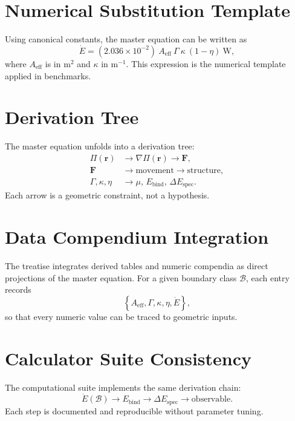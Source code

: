 \documentclass[12pt]{book}
\begin{document}
\section{Numerical Substitution Template}
Using canonical constants, the master equation can be written as
\begin{equation}
\dot{E} = (2.036 \times 10^{-2})\ A_{\text{eff}}\ \Gamma\ \kappa\ (1-\eta)\ \text{W},
\end{equation}
where $A_{\text{eff}}$ is in $\text{m}^2$ and $\kappa$ in $\text{m}^{-1}$. This expression is the
numerical template applied in benchmarks.

\section{Derivation Tree}
The master equation unfolds into a derivation tree:
\begin{align}
\Pi(\mathbf{r}) &\rightarrow \nabla \Pi(\mathbf{r}) \rightarrow \mathbf{F},\\
\mathbf{F} &\rightarrow \text{movement} \rightarrow \text{structure},\\
\Gamma,\kappa,\eta &\rightarrow \mu,\, E_{\text{bind}},\, \Delta E_{\text{spec}}.
\end{align}
Each arrow is a geometric constraint, not a hypothesis.

\section{Data Compendium Integration}
The treatise integrates derived tables and numeric compendia as direct projections of the master
equation. For a given boundary class $\mathcal{B}$, each entry records
\begin{equation}
\left\{A_{\text{eff}}, \Gamma, \kappa, \eta, \dot{E}\right\},
\end{equation}
so that every numeric value can be traced to geometric inputs.

\section{Calculator Suite Consistency}
The computational suite implements the same derivation chain:
\begin{equation}
\dot{E}(\mathcal{B}) \rightarrow E_{\text{bind}} \rightarrow \Delta E_{\text{spec}} \rightarrow \text{observable}.
\end{equation}
Each step is documented and reproducible without parameter tuning.
\end{document}
